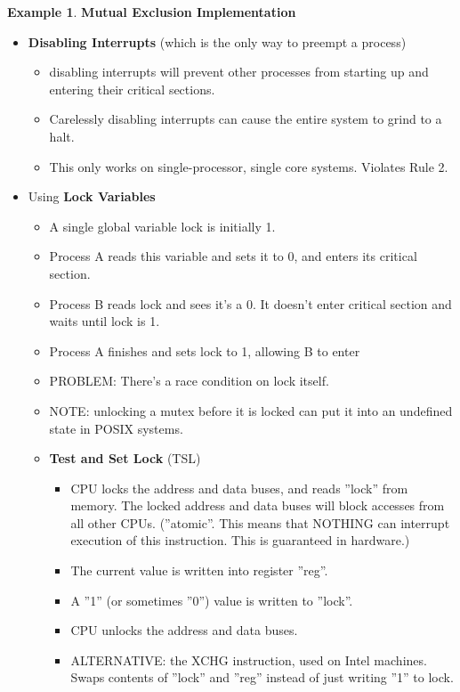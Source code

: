\documentclass[11pt,a4paper]{article}
\theoremstyle{definition}
\newtheorem{example}{Example}[section]
\newenvironment{myitemize}
{ \begin{itemize}
    \setlength{\itemsep}{5pt}
    \setlength{\parskip}{0pt}
    \setlength{\parsep}{0pt}     }
{ \end{itemize}                  }
\begin{document}
\begin{example}{\textbf{Mutual Exclusion Implementation}}
	\begin{myitemize}
		\item \textbf{Disabling Interrupts} (which is the only way to preempt a process)
		\begin{myitemize}
			\item disabling interrupts will prevent other processes from starting up and entering their critical sections.
			\item Carelessly disabling interrupts can cause the entire system to grind to a halt.
			\item This only works on single-processor, single core systems. Violates Rule 2.
		\end{myitemize}
		\item Using \textbf{Lock Variables}
		\begin{myitemize}
			\item A single global variable \textsf{lock} is initially 1.
			\item Process A reads this variable and sets it to 0, and enters its critical section.
			\item Process B reads \textsf{lock} and sees it’s a 0. It doesn’t enter critical section and waits until \textsf{lock} is 1.
			\item Process A finishes and sets \textsf{lock} to 1, allowing B to enter
			\item PROBLEM: There’s a race condition on \textsf{lock}  itself.
			\item NOTE: unlocking a mutex before it is locked can put it into an undefined state in POSIX systems.
			\item \textbf{Test and Set Lock} (\textsf{TSL})
			\begin{myitemize}
				\item CPU locks the address and data buses, and reads ''lock'' from memory. The locked address and data buses will block accesses from all other CPUs. (''atomic''. This means that NOTHING can interrupt execution of this instruction. This is guaranteed in hardware.)
				\item The current value is written into register ''reg''.
				\item A ''1'' (or sometimes ''0'') value is written to ''lock''.
				\item CPU unlocks the address and data buses.
				\item ALTERNATIVE: the XCHG instruction, used on Intel machines. Swaps contents of ''lock'' and ''reg'' instead of just writing ''1'' to lock.

\end{myitemize}
\end{myitemize}
\end{myitemize}
\end{example}
\end{document}
